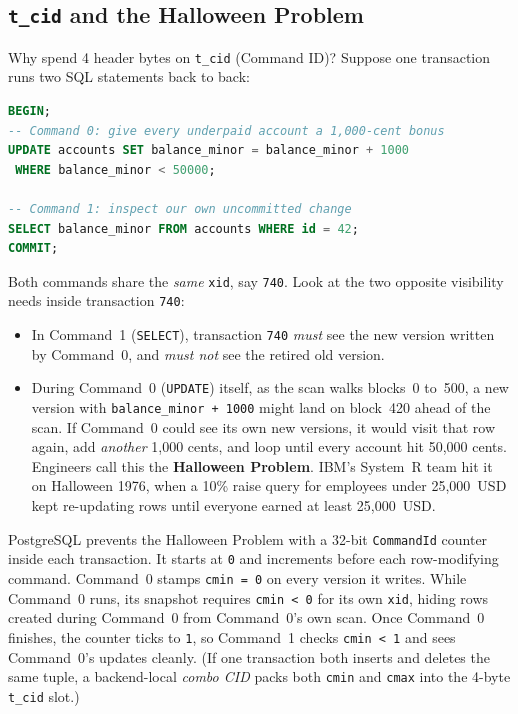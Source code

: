 \subsection{\texttt{t\_cid} and the Halloween Problem}

Why spend 4 header bytes on \texttt{t\_cid} (Command ID)? Suppose one transaction runs two SQL statements back to back:

\begin{lstlisting}[language=SQL]
BEGIN;
-- Command 0: give every underpaid account a 1,000-cent bonus
UPDATE accounts SET balance_minor = balance_minor + 1000
 WHERE balance_minor < 50000;

-- Command 1: inspect our own uncommitted change
SELECT balance_minor FROM accounts WHERE id = 42;
COMMIT;
\end{lstlisting}

Both commands share the \emph{same} \texttt{xid}, say \texttt{740}. Look at the two opposite visibility needs inside transaction \texttt{740}:
\begin{itemize}
  \item In Command~1 (\texttt{SELECT}), transaction \texttt{740} \emph{must} see the new version written by Command~0, and \emph{must not} see the retired old version.
  \item During Command~0 (\texttt{UPDATE}) itself, as the scan walks blocks~0 to~500, a new version with \texttt{balance\_minor + 1000} might land on block~420 ahead of the scan. If Command~0 could see its own new versions, it would visit that row again, add \emph{another} 1,000 cents, and loop until every account hit 50,000 cents. Engineers call this the \textbf{Halloween Problem}. IBM's System~R team hit it on Halloween 1976, when a 10\% raise query for employees under 25,000~USD kept re-updating rows until everyone earned at least 25,000~USD.
\end{itemize}

PostgreSQL prevents the Halloween Problem with a 32-bit \texttt{CommandId} counter inside each transaction. It starts at \texttt{0} and increments before each row-modifying command. Command~0 stamps \texttt{cmin = 0} on every version it writes. While Command~0 runs, its snapshot requires \texttt{cmin < 0} for its own \texttt{xid}, hiding rows created during Command~0 from Command~0's own scan. Once Command~0 finishes, the counter ticks to \texttt{1}, so Command~1 checks \texttt{cmin < 1} and sees Command~0's updates cleanly. (If one transaction both inserts and deletes the same tuple, a backend-local \emph{combo CID} packs both \texttt{cmin} and \texttt{cmax} into the 4-byte \texttt{t\_cid} slot.)

